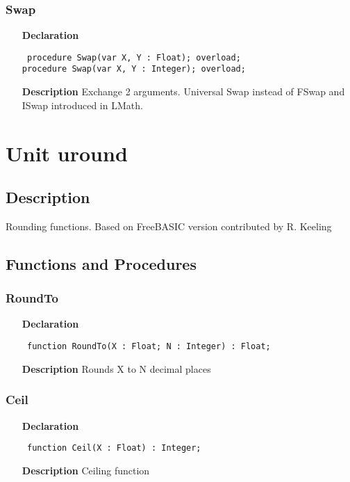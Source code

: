 \documentclass[12pt,a4paper,oneside]{report}
\newcommand{\lmath}[1]{   %
	\marginpar{\vspace{#1} 
		\begin{flushright}
			LMath
	\end{flushright} }
}
\newcommand{\declarationitem}[1]{\textbf{#1}}
\newcommand{\descriptiontitle}[1]{\textbf{#1}}
\newcommand{\code}[1]{\texttt{#1}}
\begin{document}
\subsubsection{Swap}\lmath{-24pt}
\label{uminmax-Swap}
\begin{itemize}\item[\declarationitem{Declaration}\hfill]
	\begin{flushleft}
		\code{
			procedure Swap(var X, Y : Float); overload;\\
			procedure Swap(var X, Y : Integer); overload;}
	\end{flushleft}
	\item[\descriptiontitle{Description}]
	Exchange 2 arguments. Universal Swap instead of FSwap and ISwap introduced in LMath.
\end{itemize}
\section{Unit uround}
\label{uround}
\subsection{Description}
Rounding functions. Based on FreeBASIC version contributed by R. Keeling 
\subsection{Functions and Procedures}
\subsubsection{RoundTo}
\label{uround-RoundTo}
\begin{itemize}\item[\declarationitem{Declaration}\hfill]
	\begin{flushleft}
		\code{
			function RoundTo(X : Float; N : Integer) : Float;}
		
	\end{flushleft}
	
	\par
	\item[\descriptiontitle{Description}]
	Rounds X to N decimal places
	
\end{itemize}
\subsubsection{Ceil}
\label{uround-Ceil}
\begin{itemize}\item[\declarationitem{Declaration}\hfill]
	\begin{flushleft}
		\code{
			function Ceil(X : Float) : Integer;}
		
	\end{flushleft}
	
	\par
	\item[\descriptiontitle{Description}]
	Ceiling function
	
\end{itemize}
\end{document}
